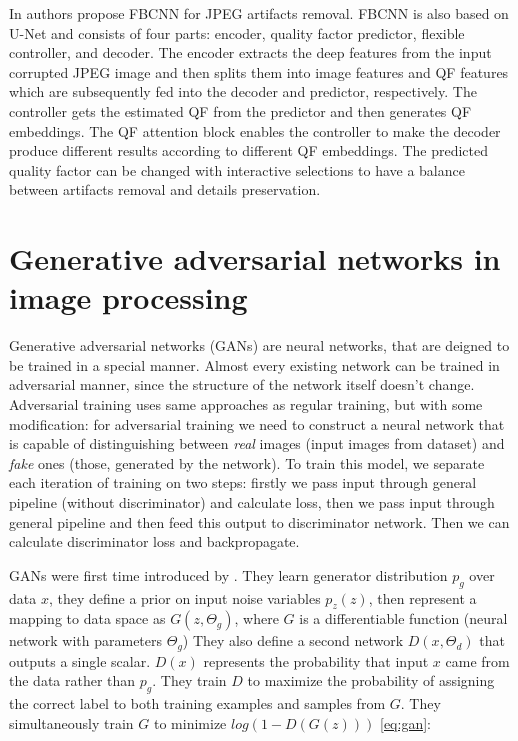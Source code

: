 In \cite{jiang_towards_2021} authors propose FBCNN for JPEG artifacts removal. FBCNN is also based on U-Net \cite{ronneberger_u-net_2015} and consists of four parts: encoder, quality factor predictor, flexible controller, and decoder. The encoder extracts the deep features from the input corrupted JPEG image and then splits them into image features and QF features which are subsequently fed into the decoder and predictor, respectively. The controller gets the estimated QF from the predictor and then generates QF embeddings. The QF attention block enables the controller to make the decoder produce different results according to different QF embeddings. The predicted quality factor can be changed with interactive selections to have a balance between artifacts removal and details preservation.

\section{Generative adversarial networks in image processing}

Generative adversarial networks (GANs) are neural networks, that are deigned to be trained in a special manner. Almost every existing network can be trained in adversarial manner, since the structure of the network itself doesn't change. Adversarial training uses same approaches as regular training, but with some modification: for adversarial training we need to construct a neural network that is capable of distinguishing between \textit{real} images (input images from dataset) and \textit{fake} ones (those, generated by the network). To train this model, we separate each iteration of training on two steps: firstly we pass input through general pipeline (without discriminator) and calculate loss, then we pass input through general pipeline and then feed this output to discriminator network. Then we can calculate discriminator loss and backpropagate.

GANs were first time introduced by \cite[Goodfellow et al]{Goodfellow_Pouget-Abadie_Mirza_Xu_Warde-Farley_Ozair_Courville_Bengio_2014}. They learn generator distribution $p_g$ over data $x$, they define a prior on input noise variables $p_z(z)$, then represent a mapping to data space as $G(z, \Theta_g)$, where $G$ is a differentiable function (neural network with parameters $\Theta_g$) They also define a second network $D(x, \Theta_d)$ that outputs a single scalar. $D(x)$ represents the probability that input $x$ came from the data rather than $p_g$. They train $D$ to maximize the probability of assigning the correct label to both training examples and samples from $G$. They simultaneously train $G$ to minimize $log(1 − D(G(z)))$ \ref{eq:gan}:

